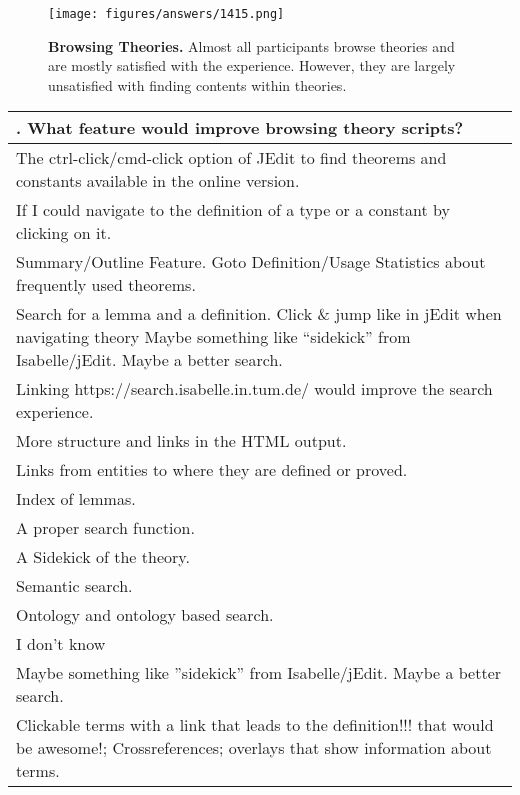 \documentclass[bsc,frontabs,oneside,singlespacing,parskip,deptreport,logo]{infthesis}
\begin{document}
\begin{figure}[h]
    \centering
    \texttt{[image: figures/answers/1415.png]}
    \caption{\textbf{Browsing Theories.}
    Almost all participants browse theories and are mostly satisfied with the experience. However, they are largely unsatisfied with finding contents within theories.}
    \label{fig:theory-scripts-1}
\end{figure}

\begin{table}[h!]
\centering
{}
\begin{tabularx}{\textwidth}{X}
{\sf 16. What feature would improve browsing theory scripts?}
\vspace{0.3cm}\\ 
\hline
\footnotesize
The ctrl-click/cmd-click option of JEdit to find theorems and constants available in the online version.\\
\footnotesize
If I could navigate to the definition of a type or a constant by clicking on it.\\
\footnotesize
Summary/Outline Feature. Goto Definition/Usage Statistics about frequently used theorems.\\
\footnotesize
Search for a lemma and a definition. Click \& jump like in jEdit when navigating theory
\footnotesize
Maybe something like ``sidekick''  from Isabelle/jEdit. Maybe a better search.\\
\footnotesize
Linking https://search.isabelle.in.tum.de/ would improve the search experience.\\
\footnotesize
More structure and links in the HTML output.\\
\footnotesize
Links from entities to where they are defined or proved.\\
\footnotesize
Index of lemmas.\\
\footnotesize
A proper search function. \\ 
\footnotesize
A Sidekick of the theory.\\
\footnotesize
Semantic search.\\
\footnotesize
Ontology and ontology based search.\\
\footnotesize
I don't know\\
\footnotesize
Maybe something like ''sidekick'' from Isabelle/jEdit. Maybe a better search.\\
\footnotesize
Clickable terms with a link that leads to the definition!!! that would be awesome!; Crossreferences; overlays that show information about terms.\\

\end{tabularx}
\end{table}
\end{document}
